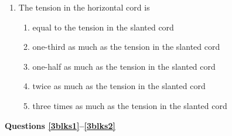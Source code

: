 \documentclass{../../../oss-classkick}
\begin{document}
\begin{multicols*}{2}
\begin{enumerate}[resume,leftmargin=18pt]
  \item The tension in the horizontal cord is
    \begin{enumerate}[nosep,leftmargin=18pt,label=(\Alph*)]
    \item equal to the tension in the slanted cord
    \item one-third as much as the tension in the slanted cord
    \item one-half as much as the tension in the slanted cord
    \item twice as much as the tension in the slanted cord
    \item three times as much as the tension in the slanted cord
    \end{enumerate}
    \label{q:2cords2}
  \end{enumerate}
  \columnbreak
  

  
  \textbf{Questions \ref{3blks1}--\ref{3blks2}}


\end{multicols*}
\end{document}

